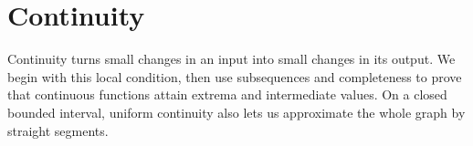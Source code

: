 \chapter{Continuity}
\label{ch:analysis-i:continuity}


Continuity turns small changes in an input into small changes in its output.
We begin with this local condition, then use subsequences and completeness
to prove that continuous functions attain extrema and intermediate values.
On a closed bounded interval, uniform continuity also lets us approximate
the whole graph by straight segments.






